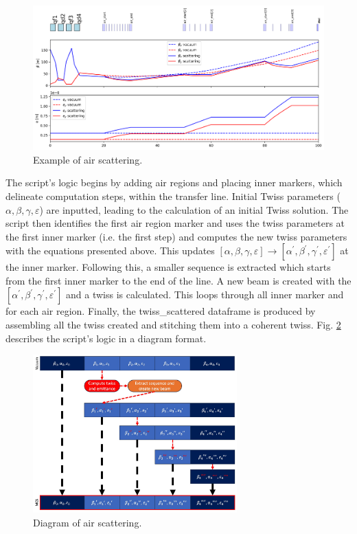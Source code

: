 \documentclass{cernatsnote}
\begin{document}
\begin{figure}[!htb]
\centering
\includegraphics[width=1.0\textwidth]{images/example_air_scattering.png}
\caption{Example of air scattering.}
\label{fig:example_air_scattering}
\end{figure}

The script's logic begins by adding air regions and placing inner markers, which delineate computation steps, within the transfer line. Initial Twiss parameters ($\alpha, \beta, \gamma, \varepsilon$) are inputted, leading to the calculation of an initial Twiss solution. The script then identifies the first air region marker and uses the twiss parameters at the first inner marker (i.e. the first step) and computes the new twiss parameters with the equations presented above. This updates $[\alpha,\beta,\gamma,\varepsilon] \rightarrow [\alpha^{'},\beta^{'},\gamma^{'},\varepsilon^{'}]$ at the inner marker. Following this, a smaller sequence is extracted which starts from the first inner marker to the end of the line. A new beam is created with the $[\alpha^{'},\beta^{'},\gamma^{'},\varepsilon^{'}]$ and a twiss is calculated. This loops through all inner marker and for each air region. Finally, the twiss\_scattered dataframe is produced by assembling all the twiss created and stitching them into a coherent twiss. Fig. \ref{fig:diagram_air_scattering} describes the script's logic in a diagram format.

\begin{figure}[!htb]
\centering
\includegraphics[width=0.7\textwidth]{images/diagram_air_scattering.jpg}
\caption{Diagram of air scattering.}
\label{fig:diagram_air_scattering}
\end{figure}
\end{document}

